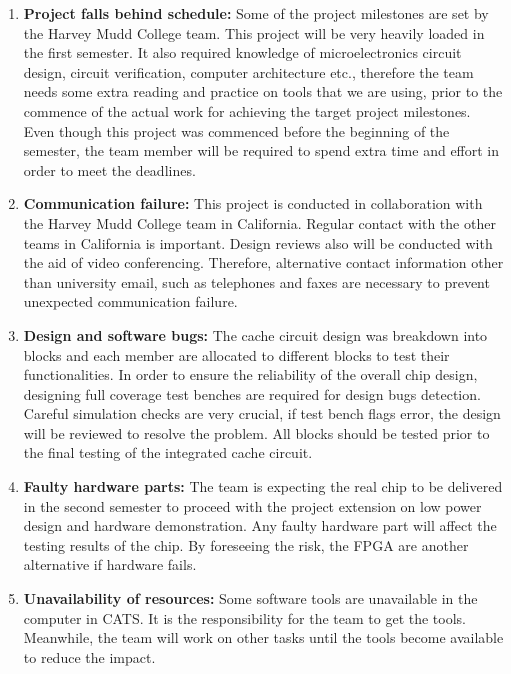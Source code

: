 \documentclass[a4paper,12pt]{article}
\begin{document}
\begin{enumerate}
\item \textbf{Project falls behind schedule:} Some of the project
	milestones are set by the Harvey Mudd College team. This
	project will be very heavily loaded in the first semester. It
	also required knowledge of microelectronics circuit design,
	circuit verification, computer architecture etc., therefore
	the team needs some extra reading and practice on tools that
	we are using, prior to the commence of the actual work for
	achieving the target project milestones. Even though this
	project was commenced before the beginning of the semester,
	the team member will be required to spend extra time and
	effort in order to meet the deadlines.

\item \textbf{Communication failure:} This project is conducted in
	collaboration with the Harvey Mudd College team in
	California. Regular contact with the other teams in California
	is important. Design reviews also will be conducted with the
	aid of video conferencing. Therefore, alternative contact
	information other than university email, such as telephones
	and faxes are necessary to prevent unexpected communication
	failure.

\item \textbf{Design and software bugs:} The cache circuit design was
	breakdown into blocks and each member are allocated to
	different blocks to test their functionalities. In order to
	ensure the reliability of the overall chip design, designing
	full coverage test benches are required for design bugs
	detection. Careful simulation checks are very crucial, if test
	bench flags error, the design will be reviewed to resolve the
	problem. All blocks should be tested prior to the final
	testing of the integrated cache circuit.

\item \textbf{Faulty hardware parts:} The team is expecting the real
	chip to be delivered in the second semester to proceed with
	the project extension on low power design and hardware
	demonstration. Any faulty hardware part will affect the
	testing results of the chip. By foreseeing the risk, the FPGA
	are another alternative if hardware fails.

\item \textbf{Unavailability of resources:} Some software tools are
	unavailable in the computer in CATS. It is the responsibility
	for the team to get the tools. Meanwhile, the team will work
	on other tasks until the tools become available to reduce the
	impact.


\end{enumerate}
\end{document}
